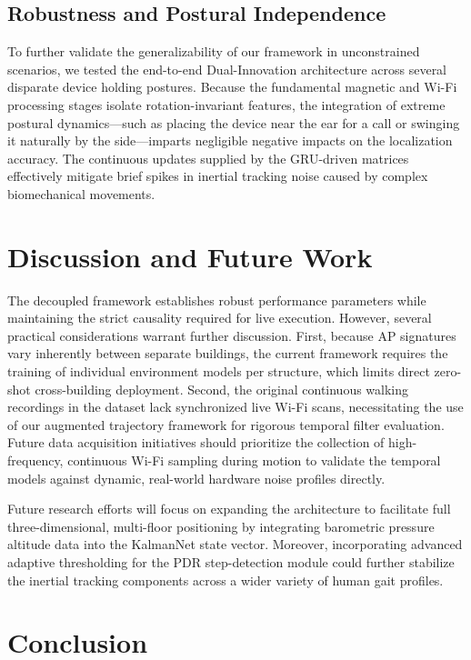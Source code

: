 \documentclass[conference]{IEEEtran}
\begin{document}
\subsection{Robustness and Postural Independence}

To further validate the generalizability of our framework in unconstrained scenarios, we tested the end-to-end Dual-Innovation architecture across several disparate device holding postures. Because the fundamental magnetic and Wi-Fi processing stages isolate rotation-invariant features, the integration of extreme postural dynamics—such as placing the device near the ear for a call or swinging it naturally by the side—imparts negligible negative impacts on the localization accuracy. The continuous updates supplied by the GRU-driven matrices effectively mitigate brief spikes in inertial tracking noise caused by complex biomechanical movements.

\section{Discussion and Future Work}

The decoupled framework establishes robust performance parameters while maintaining the strict causality required for live execution. However, several practical considerations warrant further discussion. First, because AP signatures vary inherently between separate buildings, the current framework requires the training of individual environment models per structure, which limits direct zero-shot cross-building deployment. Second, the original continuous walking recordings in the dataset lack synchronized live Wi-Fi scans, necessitating the use of our augmented trajectory framework for rigorous temporal filter evaluation. Future data acquisition initiatives should prioritize the collection of high-frequency, continuous Wi-Fi sampling during motion to validate the temporal models against dynamic, real-world hardware noise profiles directly.

Future research efforts will focus on expanding the architecture to facilitate full three-dimensional, multi-floor positioning by integrating barometric pressure altitude data into the KalmanNet state vector. Moreover, incorporating advanced adaptive thresholding for the PDR step-detection module could further stabilize the inertial tracking components across a wider variety of human gait profiles.

\section{Conclusion}\label{sec:conclusion}
\end{document}
